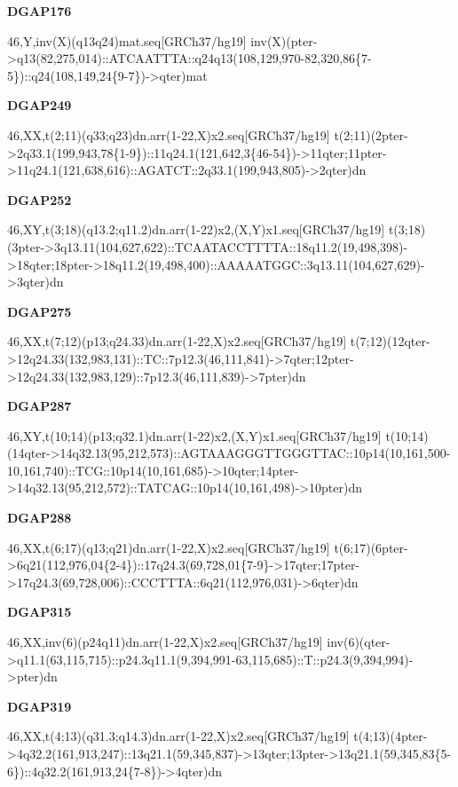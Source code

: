 \documentclass[a4paper,twoside=true,openright,parskip=full,chapterprefix=true,11pt,headings=normal,bibliography=totoc,listof=totoc,titlepage=on,captions=tableabove,draft=false]{scrreprt}
\theoremstyle{definition}
\theoremstyle{definition}
\theoremstyle{definition}
\theoremstyle{remark}
\begin{document}
\textbf{DGAP176}

46,Y,inv(X)(q13q24)mat.seq{[}GRCh37/hg19{]}
inv(X)(pter-\textgreater{}q13(82,275,014)::ATCAATTTA::q24q13(108,129,970-82,320,86\{7-5\})::q24(108,149,24\{9-7\})-\textgreater{}qter)mat

\textbf{DGAP249}

46,XX,t(2;11)(q33;q23)dn.arr(1-22,X)x2.seq{[}GRCh37/hg19{]}
t(2;11)(2pter-\textgreater{}2q33.1(199,943,78\{1-9\})::11q24.1(121,642,3\{46-54\})-\textgreater{}11qter;11pter-\textgreater{}11q24.1(121,638,616)::AGATCT::2q33.1(199,943,805)-\textgreater{}2qter)dn

\textbf{DGAP252}

46,XY,t(3;18)(q13.2;q11.2)dn.arr(1-22)x2,(X,Y)x1.seq{[}GRCh37/hg19{]}
t(3;18)(3pter-\textgreater{}3q13.11(104,627,622)::TCAATACCTTTTA::18q11.2(19,498,398)-\textgreater{}18qter;18pter-\textgreater{}18q11.2(19,498,400)::AAAAATGGC::3q13.11(104,627,629)-\textgreater{}3qter)dn

\textbf{DGAP275}

46,XX,t(7;12)(p13;q24.33)dn.arr(1-22,X)x2.seq{[}GRCh37/hg19{]}
t(7;12)(12qter-\textgreater{}12q24.33(132,983,131)::TC::7p12.3(46,111,841)-\textgreater{}7qter;12pter-\textgreater{}12q24.33(132,983,129)::7p12.3(46,111,839)-\textgreater{}7pter)dn

\textbf{DGAP287}

46,XY,t(10;14)(p13;q32.1)dn.arr(1-22)x2,(X,Y)x1.seq{[}GRCh37/hg19{]}
t(10;14)(14qter-\textgreater{}14q32.13(95,212,573)::AGTAAAGGGTTGGGTTAC::10p14(10,161,500-10,161,740)::TCG::10p14(10,161,685)-\textgreater{}10qter;14pter-\textgreater{}14q32.13(95,212,572)::TATCAG::10p14(10,161,498)-\textgreater{}10pter)dn

\textbf{DGAP288}

46,XX,t(6;17)(q13;q21)dn.arr(1-22,X)x2.seq{[}GRCh37/hg19{]}
t(6;17)(6pter-\textgreater{}6q21(112,976,04\{2-4\})::17q24.3(69,728,01\{7-9\}-\textgreater{}17qter;17pter-\textgreater{}17q24.3(69,728,006)::CCCTTTA::6q21(112,976,031)-\textgreater{}6qter)dn

\textbf{DGAP315}

46,XX,inv(6)(p24q11)dn.arr(1-22,X)x2.seq{[}GRCh37/hg19{]}
inv(6)(qter-\textgreater{}q11.1(63,115,715)::p24.3q11.1(9,394,991-63,115,685)::T::p24.3(9,394,994)-\textgreater{}pter)dn

\textbf{DGAP319}

46,XX,t(4;13)(q31.3;q14.3)dn.arr(1-22,X)x2.seq{[}GRCh37/hg19{]}
t(4;13)(4pter-\textgreater{}4q32.2(161,913,247)::13q21.1(59,345,837)-\textgreater{}13qter;13pter-\textgreater{}13q21.1(59,345,83\{5-6\})::4q32.2(161,913,24\{7-8\})-\textgreater{}4qter)dn
\end{document}

